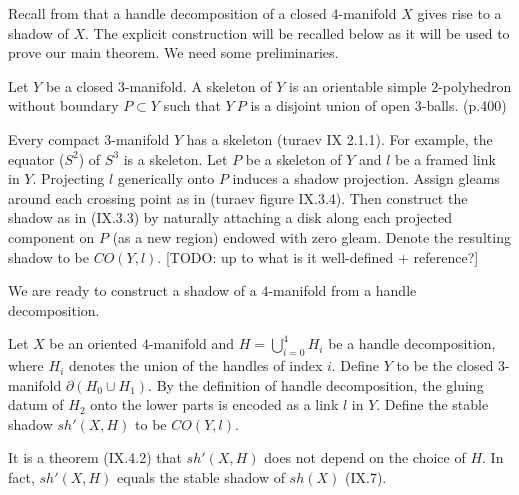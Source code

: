 \noindent Recall from \cite[section IX. 4]{turaev} that a handle
decomposition of a closed $4$-manifold $X$ gives rise to a shadow
of $X$. The explicit construction will be recalled below as it
will be used to prove our main theorem. We need some
preliminaries.

\begin{definition}\label{def/skeleton-of-a-3-manifold}
  Let $Y$ be a closed $3$-manifold. A skeleton of $Y$ is an
  orientable simple $2$-polyhedron without boundary $P \subset Y$
  such that $Y \ P$ is a disjoint union of open $3$-balls.
  (p.400)
\end{definition}

\begin{definition}\label{def/shadow-cone-of-a-framed-link-in-a-3-manifold}
  \noindent Every compact $3$-manifold $Y$ has a skeleton (turaev
  IX 2.1.1). For example, the equator ($S^{2}$) of $S^{3}$ is a
  skeleton. Let $P$ be a skeleton of $Y$ and $l$ be a framed link
  in $Y$. Projecting $l$ generically onto $P$ induces a shadow
  projection. Assign gleams around each crossing point as in
  (turaev figure IX.3.4). Then construct the shadow as in
  (IX.3.3) by naturally attaching a disk along each projected
  component on $P$ (as a new region) endowed with zero gleam.
  Denote the resulting shadow to be $CO(Y,l)$. [TODO: up to what
  is it well-defined + reference?]
\end{definition}

\noindent We are ready to construct a shadow of a $4$-manifold
from a handle decomposition.

\begin{definition}\label{def/shadow-of-a-4-manifold-from-handle-decomposition}
  Let $X$ be an oriented $4$-manifold and
  $H = \bigcup_{i=0}^{4} H_{i}$ be a handle decomposition, where
  $H_{i}$ denotes the union of the handles of index $i$. Define
  $Y$ to be the closed $3$-manifold $\partial(H_{0} \cup H_{1})$.
  By the definition of handle decomposition, the gluing datum of
  $H_{2}$ onto the lower parts is encoded as a link $l$ in $Y$.
  Define the stable shadow $sh'(X,H)$ to be $CO(Y,l)$.
\end{definition}

\noindent It is a theorem (IX.4.2) that $sh'(X,H)$ does not
depend on the choice of $H$. In fact, $sh'(X,H)$ equals the
stable shadow of $sh(X)$ (IX.7).

